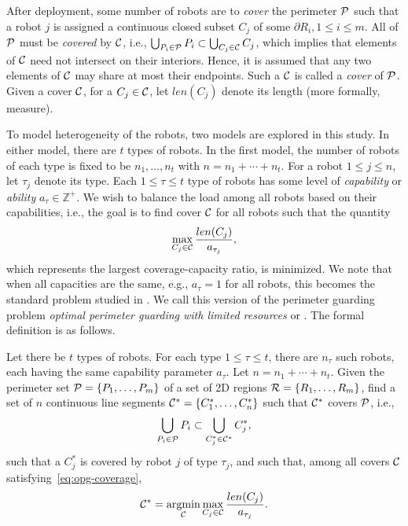 After deployment, some number of robots are to {\em cover} the perimeter 
$\P$ such that a robot $j$ is assigned a continuous closed subset $C_j$ 
of some $\partial R_i, 1 \le i \le m$. All of $\P$ must be {\em covered} 
by $\C$, i.e., 
%
$\bigcup_{P_i \in \P} P_i  \subset \bigcup_{C_j \in \C} C_j$,
%
which implies that elements of $\C$ need not intersect on their interiors. 
Hence, it is assumed that any two elements of $\C$ may share at most their 
endpoints. Such a $\C$ is called a {\em cover} of $\P$. Given a cover 
$\C$, for a $C_j \in \C$, let $len(C_j)$ denote its length (more formally, 
measure). 

To model heterogeneity of the robots, two models are explored in this
study. In either model, there are $t$ types of robots. In the first model,
the number of robots of each type is fixed to be $n_1, \ldots, n_t$ with 
$n = n_1 + \cdots + n_t$. For a robot $1 \le j \le n$, let $\tau_j$ denote 
its type. Each $1 \le \tau \le t$ type of robots has some 
level of {\em capability} or {\em ability} $a_{\tau} \in \mathbb Z^+$. We 
wish to balance the load among all robots based on their capabilities, 
i.e., the goal is to find cover $\C$ for all robots such that the quantity 
\[
\max_{C_j \in \C} \frac{len(C_j)}{a_{\tau_j}},
\]
which represents the largest coverage-capacity ratio, is minimized. 
We note that when all capacities are the same, e.g., $a_{\tau} = 1$ for 
all robots, this becomes the standard \opg problem studied in \cite{FenHanGaoYu19RSS}. 
We call this version of the perimeter guarding problem {\em optimal 
	perimeter guarding with limited resources} or \opglr. The formal 
definition is as follows.

\begin{problem} Let there be $t$ types of robots. For each type $1\le \tau 
	\le t$, there are $n_{\tau}$ such robots, each having the same 
	capability parameter $a_{\tau}$. Let $n = n_1 + \cdots + n_t$. 
	Given the perimeter set $\P = \{P_1, \ldots, P_m\}$ of a set of 
	2D regions $\R =\{R_1, \ldots, R_m\}$, find a set of $n$ continuous 
	line segments $\C^* = \{C_1^*, \ldots, C_n^*\}$ such that $\C^*$ covers 
	$\P$, i.e., \begin{align}\label{eq:opg-coverage}
	\bigcup_{P_i \in \P} P_i  \subset \bigcup_{C_j^* \in \C^*} C_j^*,
	\end{align}
	such that a $C_j^*$ is covered by robot $j$ of type $\tau_j$, and such that,
	among all covers $\C$ satisfying~\eqref{eq:opg-coverage}, 
	\begin{align}\label{eq:opg-objective}
	\C^* = \underset{\C}{\mathrm{argmin}} \max_{C_j \in \C} 
	\frac{len(C_j)}{a_{\tau_j}}.
	\end{align}
\end{problem}

